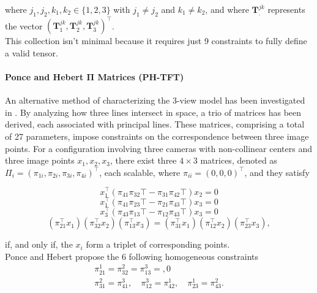 where \( j_1, j_2, k_1, k_2 \in \{1, 2, 3\} \) with \( j_1 \neq j_2 \) and \( k_1 \neq k_2 \), and where \( \bm{T}_.^{jk} \) represents the vector \( (\bm{T}_1^{jk}, \bm{T}_2^{jk}, \bm{T}_3^{jk})^\top \).\\

This collection isn't minimal because it requires just 9 constraints to fully define a valid tensor.

\paragraph{Ponce and Hebert \( \bm{\Pi} \) Matrices (\acs{PH-TFT})}
An alternative method of characterizing the 3-view model has been investigated in \cite{8-ponce-hebert-param}. By analyzing how three lines intersect in space, a trio of matrices has been derived, each associated with principal lines. These matrices, comprising a total of 27 parameters, impose constraints on the correspondence between three image points. For a configuration involving three cameras with non-collinear centers and three image points \( x_1, x_2, x_3 \), there exist three \( 4 \times 3 \) matrices, denoted as \( \Pi_i = (\pi_{1i}, \pi_{2i}, \pi_{3i}, \pi_{4i})^\top \), each scalable, where \( \pi_{ii} = (0, 0, 0)^\top \), and they satisfy

\begin{equation}
	x_1^\top (\pi_{41}\pi_{32}\top - \pi_{31}\pi_{42}\top) x_2 = 0
	\label{eq:phConst1}
\end{equation}
\begin{equation}
	x_1^\top (\pi_{41}\pi_{23}\top - \pi_{21}\pi_{43}\top) x_3 = 0
	\label{eq:phConst2}
\end{equation}
\begin{equation}
	x_3^\top (\pi_{43}\pi_{13}\top - \pi_{12}\pi_{43}\top) x_3 = 0
	\label{eq:phConst3}
\end{equation}
\begin{equation}
	(\pi_{21}^\top x_1) (\pi_{32}^\top x_2) (\pi_{13}^\top x_3) = (\pi_{31}^\top x_1) (\pi_{12}^\top x_2) (\pi_{23}^\top x_3),
	\label{eq:phConst4}
\end{equation}

if, and only if, the \( x_i \) form a triplet of corresponding points.\\
Ponce and Hebert propose the 6 following homogeneous constraints
\begin{equation}
	\begin{gathered}
		\pi_{21}^1 = \pi_{32}^2 = \pi_{13}^3 = ,0\\
		\pi_{31}^2 = \pi_{41}^3, \quad \pi_{12}^3 = \pi_{42}^1, \quad \pi_{23}^1 = \pi_{43}^2.
	\end{gathered}
\end{equation}

